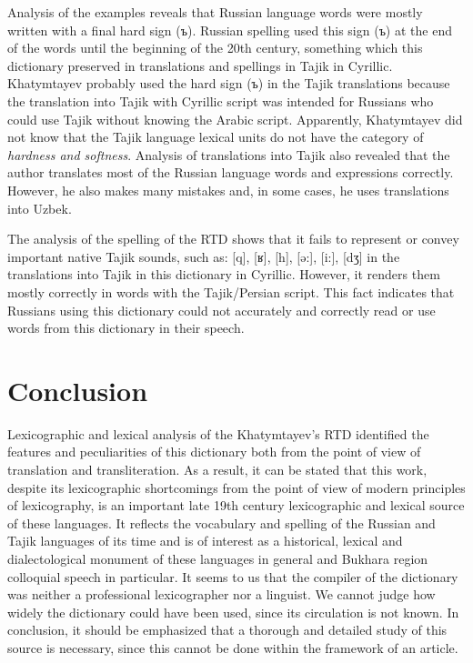\documentclass[output=paper,colorlinks,citecolor=brown,arabicfont,chinesefont]{langscibook}
\begin{document}
Analysis of the examples reveals that Russian language words were mostly written with a final hard sign (ъ). Russian spelling used this sign (ъ) at the end of the words until the beginning of the 20th century, something which this dictionary preserved in translations and spellings in Tajik in Cyrillic.  Khatymtayev probably used the hard sign (ъ) in the Tajik translations because the translation into  Tajik with Cyrillic script was intended for Russians who could use Tajik without knowing the Arabic script. Apparently, Khatymtayev did not know that the Tajik language lexical units do not have the category of \emph{hardness and softness}. Analysis of translations into Tajik also revealed that the author translates most of the Russian language words and expressions correctly. However, he also makes many mistakes and, in some cases, he uses translations into Uzbek. 

The analysis of the spelling of the RTD shows that it fails to represent or convey important native Tajik sounds, such as: [q], [ʁ], [h], [ə:], [i:], [dʒ] in the translations into Tajik in this dictionary in Cyrillic. However, it renders them mostly correctly in words with the Tajik/Persian script. This fact indicates that Russians using this dictionary could not accurately and correctly read or use words from this dictionary in their speech.

\section{Conclusion}

Lexicographic and lexical analysis of the Khatymtayev's RTD identified the features and peculiarities of this dictionary both from the point of view of translation and transliteration. As a result, it can be stated that this work, despite its lexicographic shortcomings from the point of view of modern principles of lexicography, is an important late 19th century lexicographic and lexical source of these languages. It reflects the vocabulary and spelling of the Russian and Tajik languages of its time and is of interest as a historical, lexical and dialectological monument of these languages in general and Bukhara region colloquial speech in particular. It seems to us that the compiler of the dictionary was neither a professional lexicographer nor a linguist. We cannot judge how widely the dictionary could have been used, since its circulation is not known. In conclusion, it should be emphasized that a thorough and detailed study of this source is necessary, since this cannot be done within the framework of an article.

{\sloppy\printbibliography[heading=subbibliography,notkeyword=this]}
\end{document}
